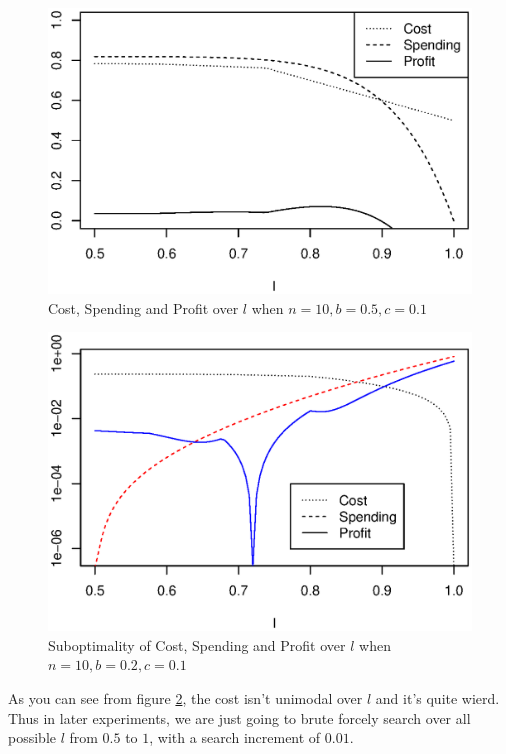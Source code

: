 \begin{figure}
\centering
    \includegraphics[trim=0mm 5mm 5mm 15mm, clip, width=\linewidth]{figures/10-0.500000-0.100000.eps}
    \caption{Cost, Spending and Profit over $l$ when $n = 10, b = 0.5, c = 0.1$}\label{fig:CSP-l-5-1}
\end{figure}

\begin{figure}
\centering
    \includegraphics[trim=0mm 5mm 5mm 15mm, clip, width=\linewidth]{figures/suboptimality.eps}
    \caption{Suboptimality of Cost, Spending and Profit over $l$ when $n = 10, b = 0.2, c = 0.1$}\label{fig:suboptimality}
\end{figure}

As you can see from figure \ref{fig:suboptimality}, the cost isn't unimodal over $l$ and it's quite wierd.
Thus in later experiments, we are just going to brute forcely search over all possible $l$ from $0.5$ to $1$,
with a search increment of $0.01$.

